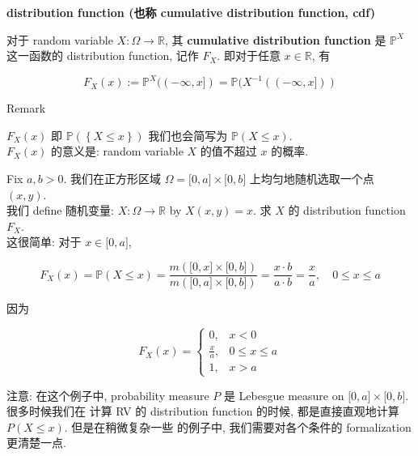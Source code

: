 \documentclass{qlnotes-export}
\begin{document}
\begin{definition}{\protect{}\label{kn-distribution-function-cumulative-distribution-function-cdf}{\textbf{distribution
function (也称 \textbf{cumulative distribution function, cdf})}}}

对于 random variable \(X:\Omega\rightarrow{\mathbb{R}}\), 其 \textbf{cumulative distribution function} 是 \({\mathbb{P}}^{X}\) 这一函数的 distribution function, 记作 \(F_{X}\). 即对于任意 \(x \in {\mathbb{R}}\), 有

\[F_{X}(x) := {\mathbb{P}}^{X}(( - \infty,x\rbrack) = {\mathbb{P}}(X^{- 1}(( - \infty,x\rbrack))\]

\end{definition}

\begin{qlremark}{Remark}

\(F_{X}(x)\) 即 \({\mathbb{P}}(\left\{ {X \leq x} \right\})\) 我们也会简写为 \({\mathbb{P}}(X \leq x)\).\\
\(F_{X}(x)\) 的意义是: random variable \(X\) 的值不超过 \(x\) 的概率.\\

\end{qlremark}

\begin{example}

Fix \(a,b > 0\). 我们在正方形区域 \(\Omega = \lbrack 0,a\rbrack \times \lbrack 0,b\rbrack\) 上均匀地随机选取一个点 \((x,y)\).\\
我们 define 随机变量: \(X:\Omega\rightarrow{\mathbb{R}}\) by \(X(x,y) = x\). 求 \(X\) 的 distribution function \(F_{X}\).\\
这很简单: 对于 \(x \in \lbrack 0,a\rbrack\),

\[F_{X}(x) = {\mathbb{P}}(X \leq x) = \frac{m(\lbrack 0,x\rbrack \times \lbrack 0,b\rbrack)}{m(\lbrack 0,a\rbrack \times \lbrack 0,b\rbrack)} = \frac{x \cdot b}{a \cdot b} = \frac{x}{a},\quad 0 \leq x \leq a\]

因为

\[F_{X}(x) = \left\{ \begin{matrix}
{0,} & {x < 0} \\
{\frac{x}{a},} & {0 \leq x \leq a} \\
{1,} & {x > a}
\end{matrix} \right.\]

注意: 在这个例子中, probability measure \(P\) 是 Lebesgue measure on \(\lbrack 0,a\rbrack \times \lbrack 0,b\rbrack\). 很多时候我们在 计算 RV 的 distribution function 的时候, 都是直接直观地计算 \(P(X \leq x)\). 但是在稍微复杂一些 的例子中, 我们需要对各个条件的 formalization 更清楚一点.

\end{example}
\end{document}
